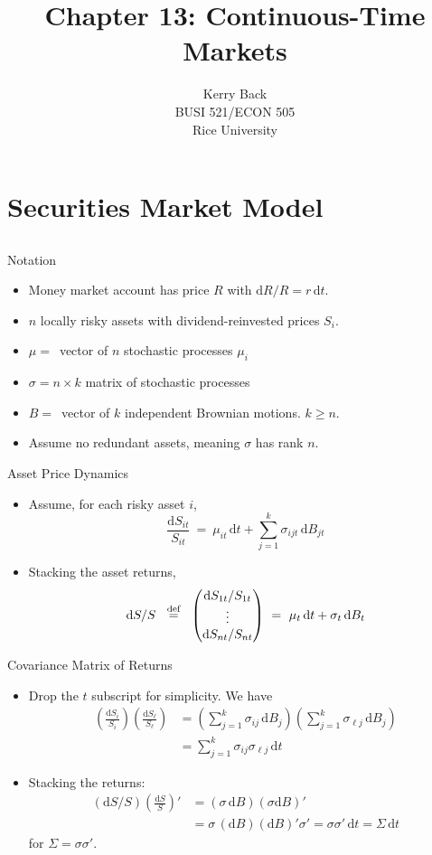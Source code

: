 \documentclass[10pt]{beamer}
\title{Chapter 13: Continuous-Time Markets}
\date{}
\author{Kerry Back\\ 
BUSI 521/ECON 505\\
Rice University}
\newcommand{\bi}{\begin{itemize}}
\newcommand{\ei}{\end{itemize}}
\newcommand{\im}{\item}
\newcommand{\D}{\mathrm{d}}
\newcommand{\eqdef}{\;\buildrel \text{d{}ef}\over = \;}
\begin{document}
\maketitle


\section{Securities Market Model}
\subsection{}

\begin{frame}{Notation}
\bi 
\im 
 Money market account has price $R$ with $\D R/R = r\,\D t$. 
 \im $n$ locally risky assets with dividend-reinvested prices $S_i$.
\im $\mu=\,$ vector of $n$ stochastic processes $\mu_i$
\im  $\sigma=n \times k$ matrix of stochastic processes
 \im $B =\,$ vector of $k$ independent Brownian motions.  $k \geq n$. 
 \im Assume no redundant assets, meaning $\sigma$ has rank $n$.
\ei 
\end{frame}


\begin{frame}{Asset Price Dynamics}

    \bi 
    \im Assume, for each risky asset $i$,
   $$\frac{\D S_{it}}{S_{it}} \ = \  \mu_{it}\,\D t + \sum_{j=1}^k \sigma_{ijt}\,\D B_{jt}$$
   \im Stacking the asset returns,
  $$\D S/S \ \eqdef \ \begin{pmatrix}\D S_{1t}/S_{1t} \\ \vdots \\ \D S_{nt}/S_{nt} \end{pmatrix}\ = \  \mu_t\,\D t + \sigma_t\,\D B_t $$
\ei

\end{frame}


\begin{frame}{Covariance Matrix of Returns}
    \bi 
    \im Drop the $t$ subscript for simplicity.  We have
    \begin{align*} 
        \left(\frac{\D S_{i}}{S_{i}}\right)\left(\frac{\D S_{\ell }}{S_{\ell }}\right) 
        &= \left(\sum_{j=1}^k \sigma_{ij}\,\D B_{j}\right)\left(\sum_{j=1}^k \sigma_{\ell j}\,\D B_{j}\right)\\
        &= \sum_{j=1}^k \sigma_{ij}\sigma_{\ell j}\,\D t
    \end{align*}
 
    \im Stacking the returns:
    \begin{align*}
        \left(\D S / S\right)\left(\frac{\D S}{S}\right)' &= (\sigma\,\D B)(\sigma \D B)' \\
        &= \sigma \,(\D B)(\D B)'\sigma' = \sigma \sigma'\,\D t = \Sigma\,\D t
    \end{align*}
    for $\Sigma = \sigma \sigma'$.
    \ei

\end{frame}
\end{document}
